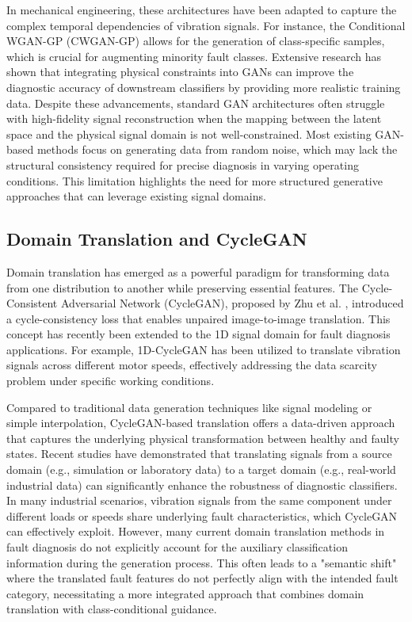 \documentclass[conference,twocolumn]{IEEEtran}
\begin{document}
In mechanical engineering, these architectures have been adapted to capture the complex temporal dependencies of vibration signals. For instance, the Conditional WGAN-GP (CWGAN-GP) \cite{7} allows for the generation of class-specific samples, which is crucial for augmenting minority fault classes. Extensive research has shown that integrating physical constraints into GANs can improve the diagnostic accuracy of downstream classifiers by providing more realistic training data. Despite these advancements, standard GAN architectures often struggle with high-fidelity signal reconstruction when the mapping between the latent space and the physical signal domain is not well-constrained. Most existing GAN-based methods focus on generating data from random noise, which may lack the structural consistency required for precise diagnosis in varying operating conditions. This limitation highlights the need for more structured generative approaches that can leverage existing signal domains.

\subsection{Domain Translation and CycleGAN}
Domain translation has emerged as a powerful paradigm for transforming data from one distribution to another while preserving essential features. The Cycle-Consistent Adversarial Network (CycleGAN), proposed by Zhu et al. \cite{4}, introduced a cycle-consistency loss that enables unpaired image-to-image translation. This concept has recently been extended to the 1D signal domain for fault diagnosis applications. For example, 1D-CycleGAN \cite{37} has been utilized to translate vibration signals across different motor speeds, effectively addressing the data scarcity problem under specific working conditions.

Compared to traditional data generation techniques like signal modeling or simple interpolation, CycleGAN-based translation \cite{36} offers a data-driven approach that captures the underlying physical transformation between healthy and faulty states. Recent studies \cite{36} have demonstrated that translating signals from a source domain (e.g., simulation or laboratory data) to a target domain (e.g., real-world industrial data) can significantly enhance the robustness of diagnostic classifiers. In many industrial scenarios, vibration signals from the same component under different loads or speeds share underlying fault characteristics, which CycleGAN can effectively exploit. However, many current domain translation methods in fault diagnosis do not explicitly account for the auxiliary classification information during the generation process. This often leads to a "semantic shift" where the translated fault features do not perfectly align with the intended fault category, necessitating a more integrated approach that combines domain translation with class-conditional guidance.
\end{document}
